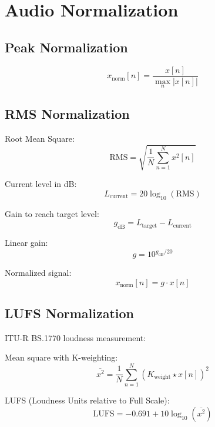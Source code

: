 \documentclass[12pt,a4paper]{article}
\begin{document}
\section{Audio Normalization}

\subsection{Peak Normalization}

\begin{equation}
x_{\text{norm}}[n] = \frac{x[n]}{\max_n |x[n]|}
\end{equation}

\subsection{RMS Normalization}

Root Mean Square:
\begin{equation}
\text{RMS} = \sqrt{\frac{1}{N} \sum_{n=1}^{N} x^2[n]}
\end{equation}

Current level in dB:
\begin{equation}
L_{\text{current}} = 20 \log_{10}(\text{RMS})
\end{equation}

Gain to reach target level:
\begin{equation}
g_{\text{dB}} = L_{\text{target}} - L_{\text{current}}
\end{equation}

Linear gain:
\begin{equation}
g = 10^{g_{\text{dB}}/20}
\end{equation}

Normalized signal:
\begin{equation}
x_{\text{norm}}[n] = g \cdot x[n]
\end{equation}

\subsection{LUFS Normalization}

ITU-R BS.1770 loudness measurement:

Mean square with K-weighting:
\begin{equation}
\overline{x^2} = \frac{1}{N} \sum_{n=1}^{N} (K_{\text{weight}} \star x[n])^2
\end{equation}

LUFS (Loudness Units relative to Full Scale):
\begin{equation}
\text{LUFS} = -0.691 + 10 \log_{10}(\overline{x^2})
\end{equation}
\end{document}
